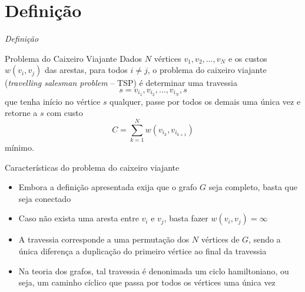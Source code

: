 \section{Definição}

\begin{frame}[fragile]{{\it Definição}}

    \begin{block}{Problema do Caixeiro Viajante}
        Dados $N$ vértices $v_1, v_2, \ldots, v_N$ e os custos $w(v_i, v_j)$ das arestas, para 
        todos $i\neq j$, o problema do caixeiro viajante (\textit{travelling salesman problem} --
        TSP) é determinar uma travessia
        \[
            s = v_{i_1}, v_{i_2}, \ldots, v_{i_N}, s
        \]
        que tenha início no vértice $s$ qualquer, passe por todos os demais uma única vez e retorne
        a $s$ com custo 
        \[
            C = \sum_{k = 1}^N w(v_{i_k}, v_{i_{k + 1}})
        \]
        mínimo.
    \end{block}

\end{frame}

\begin{frame}[fragile]{Características do problema do caixeiro viajante}

    \begin{itemize}
        \item Embora a definição apresentada exija que o grafo $G$ seja completo, basta que
            seja conectado

        \item Caso não exista uma aresta entre $v_i$ e $v_j$, basta fazer $w(v_i, v_j) = \infty$

        \item A travessia corresponde a uma permutação dos $N$ vértices de $G$, sendo a única
            diferença a duplicação do primeiro vértice ao final da travessia

        \item Na teoria dos grafos, tal travessia é denonimada um ciclo hamiltoniano, ou seja,
            um caminho cíclico que passa por todos os vértices uma única vez

    \end{itemize}

\end{frame}
